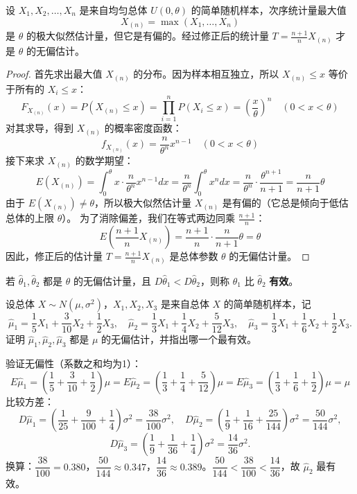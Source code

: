 \documentclass[lang=cn,11pt]{elegantbook}
\begin{document}
\begin{proposition}[均匀分布参数的无偏估计]\label{prop:uniform-unbiased}
    设 $X_1, X_2, \dots, X_n$ 是来自均匀总体 $U(0, \theta)$ 的简单随机样本，次序统计量最大值 \[X_{(n)} = \max(X_1, \dots, X_n)\]是 $\theta$ 的极大似然估计量，但它是有偏的。经过修正后的统计量 $T = \frac{n+1}{n}X_{(n)}$ 才是 $\theta$ 的无偏估计。
\end{proposition}
\begin{proof}
    首先求出最大值 $X_{(n)}$ 的分布。因为样本相互独立，所以 $X_{(n)} \le x$ 等价于所有的 $X_i \le x$：$$F_{X_{(n)}}(x) = P(X_{(n)} \le x) = \prod_{i=1}^n P(X_i \le x) = \left(\frac{x}{\theta}\right)^n \quad (0 < x < \theta)$$对其求导，得到 $X_{(n)}$ 的概率密度函数：$$f_{X_{(n)}}(x) = \frac{n}{\theta^n}x^{n-1} \quad (0 < x < \theta)$$接下来求 $X_{(n)}$ 的数学期望：$$E(X_{(n)}) = \int_0^\theta x \cdot \frac{n}{\theta^n}x^{n-1} dx = \frac{n}{\theta^n} \int_0^\theta x^n dx = \frac{n}{\theta^n} \cdot \frac{\theta^{n+1}}{n+1} = \frac{n}{n+1}\theta$$由于 $E(X_{(n)}) \ne \theta$，所以极大似然估计量 $X_{(n)}$ 是有偏的（它总是倾向于低估总体的上限 $\theta$）。
    为了消除偏差，我们在等式两边同乘 $\frac{n+1}{n}$：$$E\left(\frac{n+1}{n}X_{(n)}\right) = \frac{n+1}{n} \cdot \frac{n}{n+1}\theta = \theta$$因此，修正后的估计量 $T = \frac{n+1}{n}X_{(n)}$ 是总体参数 $\theta$ 的无偏估计量。
\end{proof}


\begin{definition}[有效性] \label{def:efficiency}
若 \(\hat{\theta}_1, \hat{\theta}_2\) 都是 \(\theta\) 的无偏估计量，且 \(D\hat{\theta}_1 < D\hat{\theta}_2\)，则称 \(\hat{\theta}_1\) 比 \(\hat{\theta}_2\) \textbf{有效}。
\end{definition}





\begin{exercise}\label{exer:7-efficiency}
设总体 \(X \sim N(\mu, \sigma^2)\)，\(X_1, X_2, X_3\) 是来自总体 \(X\) 的简单随机样本，记
\[
\hat{\mu}_1 = \frac{1}{5}X_1 + \frac{3}{10}X_2 + \frac{1}{2}X_3,\quad
\hat{\mu}_2 = \frac{1}{3}X_1 + \frac{1}{4}X_2 + \frac{5}{12}X_3,\quad
\hat{\mu}_3 = \frac{1}{3}X_1 + \frac{1}{6}X_2 + \frac{1}{2}X_3.
\]
证明 \(\hat{\mu}_1, \hat{\mu}_2, \hat{\mu}_3\) 都是 \(\mu\) 的无偏估计，并指出哪一个最有效。
\end{exercise}

\begin{solution}
验证无偏性（系数之和均为1）：
\[E\hat{\mu}_1 = \left(\dfrac{1}{5}+\dfrac{3}{10}+\dfrac{1}{2}\right)\mu =E\hat{\mu}_2 = \left(\dfrac{1}{3}+\dfrac{1}{4}+\dfrac{5}{12}\right)\mu = E\hat{\mu}_3 = \left(\dfrac{1}{3}+\dfrac{1}{6}+\dfrac{1}{2}\right)\mu = \mu\]
比较方差：
\[
D\hat{\mu}_1 = \left(\frac{1}{25}+\frac{9}{100}+\frac{1}{4}\right)\sigma^2 = \frac{38}{100}\sigma^2,\quad
D\hat{\mu}_2 = \left(\frac{1}{9}+\frac{1}{16}+\frac{25}{144}\right)\sigma^2 = \frac{50}{144}\sigma^2,
\]
\[
D\hat{\mu}_3 = \left(\frac{1}{9}+\frac{1}{36}+\frac{1}{4}\right)\sigma^2 = \frac{14}{36}\sigma^2.
\]
换算：\(\dfrac{38}{100}=0.380\)，\(\dfrac{50}{144}\approx 0.347\)，\(\dfrac{14}{36}\approx 0.389\)。\(\dfrac{50}{144} < \dfrac{38}{100} < \dfrac{14}{36}\)，故 \(\hat{\mu}_2\) 最有效。
\end{solution}
\end{document}
